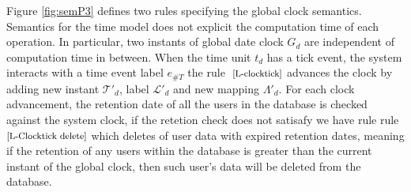  Figure \ref{fig:semP3} defines two rules specifying the global clock semantics.
 Semantics for the time model does not explicit the computation time of each operation. In particular, two instants of global date clock $ G_d$ are independent of computation time in between.  When the time unit $ t_d$ has a tick event, the system interacts with a time event label $ e_{\#T}$  the rule $  \scriptsize  \text{ [L-clocktick]}$ advances the clock by adding new instant $ \mathcal{T}'_d$, label $ \mathcal{L}'_d$ and new mapping $ \Lambda'_{d} $. For each clock advancement, the retention date of all the users in the database is checked against the system clock, if the retetion check does not satisafy we have rule rule $  \scriptsize  \text{[L-Clocktick delete]}$ which deletes of user data with expired retention dates, meaning if the retention of any users within the database is greater than the current instant of the global clock, then such user's data will be deleted from the database.  %

